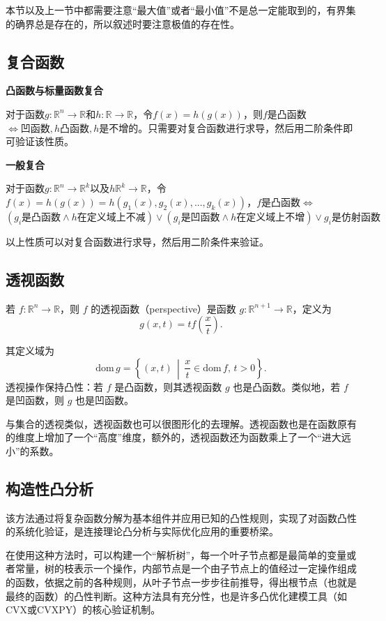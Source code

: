 \documentclass[12pt,a4paper]{book}
\begin{document}
本节以及上一节中都需要注意“最大值”或者“最小值”不是总一定能取到的，有界集的确界总是存在的，所以叙述时要注意极值的存在性。

\subsection{复合函数}

\textbf{凸函数与标量函数复合}

对于函数$g:\mathbb{R}^n\to\mathbb{R}$和$h:\mathbb{R}\to\mathbb{R}$，令$f(x)=h(g(x))$，则$f$是凸函数$\Longleftrightarrow{凹函数},h\text{凸函数},h\text{是不增的}$。只需要对复合函数进行求导，然后用二阶条件即可验证该性质。

\textbf{一般复合}

对于函数$g:\mathbb{R}^n\to\mathbb{R}^k$以及$h\mathbb{R}^k\to\mathbb{R}$，令$f(x)=h(g(x))=h(g_1(x),g_2(x),...,g_k(x))$，$f\text{是凸函数}\Longleftrightarrow $
$$(g_i\text{是凸函数}\wedge h\text{在定义域上不减})\vee (g_i\text{是凹函数}\wedge h\text{在定义域上不增})\vee g_i\text{是仿射函数} $$

以上性质可以对复合函数进行求导，然后用二阶条件来验证。

\subsection{透视函数}

若 $f: \mathbb{R}^n \to \mathbb{R}$，则 $f$ 的透视函数（perspective）是函数 $g: \mathbb{R}^{n+1} \to \mathbb{R}$，定义为
\begin{equation}
g(x, t) = tf\left(\frac{x}{t}\right).
\end{equation}

其定义域为
$$\mathrm{dom}\, g = \left\{(x, t) \,\middle|\, \frac{x}{t} \in \mathrm{dom}\, f,\, t > 0 \right\}.$$
透视操作保持凸性：若 $f$ 是凸函数，则其透视函数 $g$ 也是凸函数。类似地，若 $f$ 是凹函数，则 $g$ 也是凹函数。

与集合的透视类似，透视函数也可以很图形化的去理解。透视函数也是在函数原有的维度上增加了一个“高度”维度，额外的，透视函数还为函数乘上了一个“进大远小”的系数。

\subsection{构造性凸分析}

该方法通过将复杂函数分解为基本组件并应用已知的凸性规则，实现了对函数凸性的系统化验证，是连接理论凸分析与实际优化应用的重要桥梁。

在使用这种方法时，可以构建一个“解析树”，每一个叶子节点都是最简单的变量或者常量，树的枝表示一个操作，内部节点是一个由子节点上的值经过一定操作组成的函数，依据之前的各种规则，从叶子节点一步步往前推导，得出根节点（也就是最终的函数）的凸性判断。这种方法具有充分性，也是许多凸优化建模工具（如CVX或CVXPY）的核心验证机制。
\end{document}
